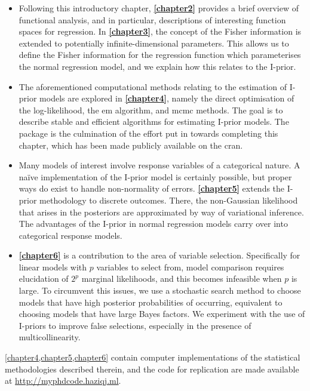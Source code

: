 \documentclass[11pt,twoside,openright,showframe]{report}
\begin{document}
\begin{itemize}
  \item Following this introductory chapter, \textbf{\cref{chapter2}} provides a brief overview of functional analysis, and in particular, descriptions of interesting function spaces for regression.
  In \textbf{\cref{chapter3}}, the concept of the Fisher information is extended to potentially infinite-dimensional parameters.
  This allows us to define the Fisher information for the regression function which parameterises the normal regression model, and we explain how this relates to the I-prior.
  
  \item The aforementioned computational methods relating to the estimation of I-prior models are explored in \textbf{\cref{chapter4}}, namely the direct optimisation of the log-likelihood, the \gls*{em} algorithm, and \gls*{mcmc} methods.
  The goal is to describe stable and efficient algorithms for estimating I-prior models.
  The  package  \citep{jamil2017iprior} is the culmination of the effort put in towards completing this chapter, which has been made publicly available on the \gls*{cran}.

  \item Many models of interest involve response variables of a categorical nature.
  A naïve implementation of the I-prior model is certainly possible, but proper ways do exist to handle non-normality of errors.
  \textbf{\cref{chapter5}} extends the I-prior methodology to discrete outcomes.
  There, the non-Gaussian likelihood that arises in the posteriors are approximated by way of variational inference.
  The advantages of the I-prior in normal regression models carry over into categorical response models.

  \item \textbf{\cref{chapter6}} is a contribution to the area of variable selection.
  Specifically for linear models with $p$ variables to select from, model comparison requires elucidation of $2^p$ marginal likelihoods, and this becomes infeasible when $p$ is large.
  To circumvent this issues, we use a stochastic search method to choose models that have high posterior probabilities of occurring, equivalent to choosing models that have large Bayes factors.
  We experiment with the use of I-priors to improve false selections, especially in the presence of multicollinearity.
\end{itemize}

\cref{chapter4,chapter5,chapter6} contain  computer implementations of the statistical methodologies described therein, and the code for replication are made available at \url{http://myphdcode.haziqj.ml}.
\end{document}
